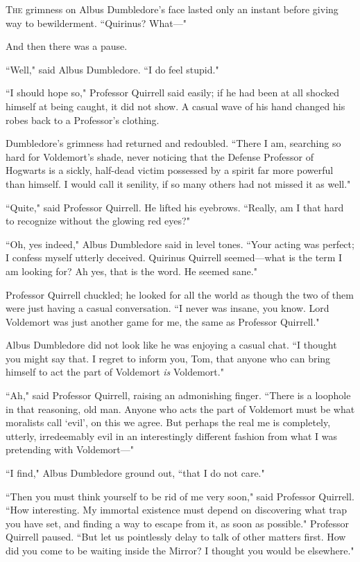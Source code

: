 
\lettrine{T}{he} grimness on Albus Dumbledore's face lasted only an instant before giving way to bewilderment. ``Quirinus? What---"

And then there was a pause.

``Well," said Albus Dumbledore. ``I do feel stupid."

``I should hope so," Professor Quirrell said easily; if he had been at all shocked himself at being caught, it did not show. A casual wave of his hand changed his robes back to a Professor's clothing.

Dumbledore's grimness had returned and redoubled. ``There I am, searching so hard for Voldemort's shade, never noticing that the Defense Professor of Hogwarts is a sickly, half-dead victim possessed by a spirit far more powerful than himself. I would call it senility, if so many others had not missed it as well."

``Quite," said Professor Quirrell. He lifted his eyebrows. ``Really, am I that hard to recognize without the glowing red eyes?"

``Oh, yes indeed," Albus Dumbledore said in level tones. ``Your acting was perfect; I confess myself utterly deceived. Quirinus Quirrell seemed---what is the term I am looking for? Ah yes, that is the word. He seemed sane."

Professor Quirrell chuckled; he looked for all the world as though the two of them were just having a casual conversation. ``I never was insane, you know. Lord Voldemort was just another game for me, the same as Professor Quirrell."

Albus Dumbledore did not look like he was enjoying a casual chat. ``I thought you might say that. I regret to inform you, Tom, that anyone who can bring himself to act the part of Voldemort \emph{is} Voldemort."

``Ah," said Professor Quirrell, raising an admonishing finger. ``There is a loophole in that reasoning, old man. Anyone who acts the part of Voldemort must be what moralists call `evil', on this we agree. But perhaps the real me is completely, utterly, irredeemably evil in an interestingly different fashion from what I was pretending with Voldemort---"

``I find," Albus Dumbledore ground out, ``that I do not care."

``Then you must think yourself to be rid of me very soon," said Professor Quirrell. ``How interesting. My immortal existence must depend on discovering what trap you have set, and finding a way to escape from it, as soon as possible." Professor Quirrell paused. ``But let us pointlessly delay to talk of other matters first. How did you come to be waiting inside the Mirror? I thought you would be elsewhere."

